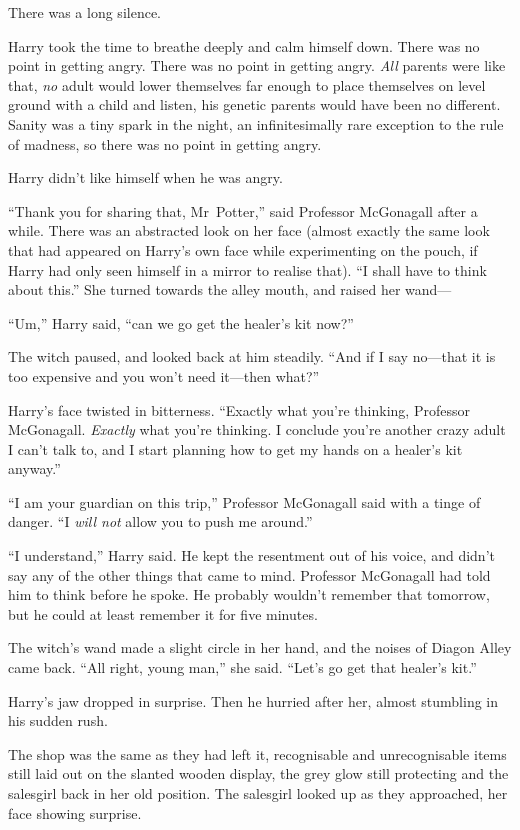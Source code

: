 There was a long silence.

Harry took the time to breathe deeply and calm himself down. There was no point in getting angry. There was no point in getting angry. \emph{All} parents were like that, \emph{no} adult would lower themselves far enough to place themselves on level ground with a child and listen, his genetic parents would have been no different. Sanity was a tiny spark in the night, an infinitesimally rare exception to the rule of madness, so there was no point in getting angry.

Harry didn’t like himself when he was angry.

“Thank you for sharing that, Mr~Potter,” said Professor McGonagall after a while. There was an abstracted look on her face (almost exactly the same look that had appeared on Harry’s own face while experimenting on the pouch, if Harry had only seen himself in a mirror to realise that). “I shall have to think about this.” She turned towards the alley mouth, and raised her wand—

“Um,” Harry said, “can we go get the healer’s kit now?”

The witch paused, and looked back at him steadily. “And if I say no—that it is too expensive and you won’t need it—then what?”

Harry’s face twisted in bitterness. “Exactly what you’re thinking, Professor McGonagall. \emph{Exactly} what you’re thinking. I conclude you’re another crazy adult I can’t talk to, and I start planning how to get my hands on a healer’s kit anyway.”

“I am your guardian on this trip,” Professor McGonagall said with a tinge of danger. “I \emph{will not} allow you to push me around.”

“I understand,” Harry said. He kept the resentment out of his voice, and didn’t say any of the other things that came to mind. Professor McGonagall had told him to think before he spoke. He probably wouldn’t remember that tomorrow, but he could at least remember it for five minutes.

The witch’s wand made a slight circle in her hand, and the noises of Diagon Alley came back. “All right, young man,” she said. “Let’s go get that healer’s kit.”

Harry’s jaw dropped in surprise. Then he hurried after her, almost stumbling in his sudden rush.

\later

The shop was the same as they had left it, recognisable and unrecognisable items still laid out on the slanted wooden display, the grey glow still protecting and the salesgirl back in her old position. The salesgirl looked up as they approached, her face showing surprise.

